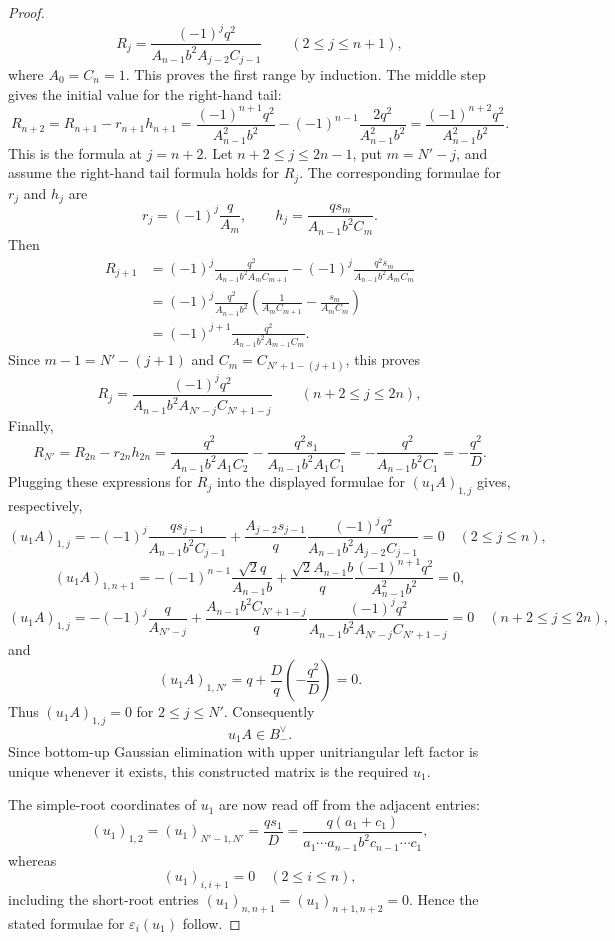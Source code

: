 \documentclass{article}
\begin{document}
\begin{proof}
\[
R_j
=
\frac{(-1)^jq^2}{A_{n-1}b^2A_{j-2}C_{j-1}}
\qquad(2\le j\le n+1),
\]
where \(A_0=C_n=1\). This proves the first range by induction. The middle step gives the initial value for the right-hand tail:
\[
R_{n+2}
=
R_{n+1}-r_{n+1}h_{n+1}
=
\frac{(-1)^{n+1}q^2}{A_{n-1}^2b^2}
-
(-1)^{n-1}\frac{2q^2}{A_{n-1}^2b^2}
=
\frac{(-1)^{n+2}q^2}{A_{n-1}^2b^2}.
\]
This is the formula at \(j=n+2\). Let \(n+2\le j\le 2n-1\), put \(m=N'-j\), and assume the right-hand tail formula holds for \(R_j\). The corresponding formulae for \(r_j\) and \(h_j\) are
\[
r_j=(-1)^j\frac{q}{A_m},
\qquad
h_j=\frac{q s_m}{A_{n-1}b^2C_m}.
\]
Then
\[
\begin{aligned}
R_{j+1}
&=
(-1)^j
\frac{q^2}{A_{n-1}b^2A_mC_{m+1}}
-
(-1)^j
\frac{q^2s_m}{A_{n-1}b^2A_mC_m}\\
&=
(-1)^j\frac{q^2}{A_{n-1}b^2}
\left(
\frac{1}{A_mC_{m+1}}
-
\frac{s_m}{A_mC_m}
\right)\\
&=
(-1)^{j+1}
\frac{q^2}{A_{n-1}b^2A_{m-1}C_m}.
\end{aligned}
\]
Since \(m-1=N'-(j+1)\) and \(C_m=C_{N'+1-(j+1)}\), this proves
\[
R_j
=
\frac{(-1)^jq^2}{A_{n-1}b^2A_{N'-j}C_{N'+1-j}}
\qquad(n+2\le j\le 2n),
\]
Finally,
\[
R_{N'}
=R_{2n}-r_{2n}h_{2n}
=
\frac{q^2}{A_{n-1}b^2A_1C_2}
-
\frac{q^2s_1}{A_{n-1}b^2A_1C_1}
=-\frac{q^2}{A_{n-1}b^2C_1}
=-\frac{q^2}{D}.
\]
Plugging these expressions for \(R_j\) into the displayed formulae for \((u_1A)_{1,j}\) gives, respectively,
\[
(u_1A)_{1,j}
=
-(-1)^j\frac{q s_{j-1}}{A_{n-1}b^2C_{j-1}}
+
\frac{A_{j-2}s_{j-1}}{q}
\frac{(-1)^jq^2}{A_{n-1}b^2A_{j-2}C_{j-1}}
=0
\quad(2\le j\le n),
\]
\[
(u_1A)_{1,n+1}
=
-(-1)^{n-1}\frac{\sqrt2q}{A_{n-1}b}
+
\frac{\sqrt2A_{n-1}b}{q}
\frac{(-1)^{n+1}q^2}{A_{n-1}^2b^2}
=0,
\]
\[
(u_1A)_{1,j}
=
-(-1)^j\frac{q}{A_{N'-j}}
+
\frac{A_{n-1}b^2C_{N'+1-j}}{q}
\frac{(-1)^jq^2}{A_{n-1}b^2A_{N'-j}C_{N'+1-j}}
=0
\quad(n+2\le j\le 2n),
\]
and
\[
(u_1A)_{1,N'}=q+\frac{D}{q}\left(-\frac{q^2}{D}\right)=0.
\]
Thus \((u_1A)_{1,j}=0\) for \(2\le j\le N'\). Consequently
\[
u_1A\in B_-^\vee.
\]
Since bottom-up Gaussian elimination with upper unitriangular left factor is unique whenever it exists, this constructed matrix is the required \(u_1\).

The simple-root coordinates of \(u_1\) are now read off from the adjacent entries:
\[
(u_1)_{1,2}=(u_1)_{N'-1,N'}=\frac{q s_1}{D}
=
\frac{q(a_1+c_1)}{a_1\cdots a_{n-1}b^2c_{n-1}\cdots c_1},
\]
whereas
\[
(u_1)_{i,i+1}=0\quad(2\le i\le n),
\]
including the short-root entries \((u_1)_{n,n+1}=(u_1)_{n+1,n+2}=0\). Hence the stated formulae for \(\varepsilon_i(u_1)\) follow.
\end{proof}
\end{document}
